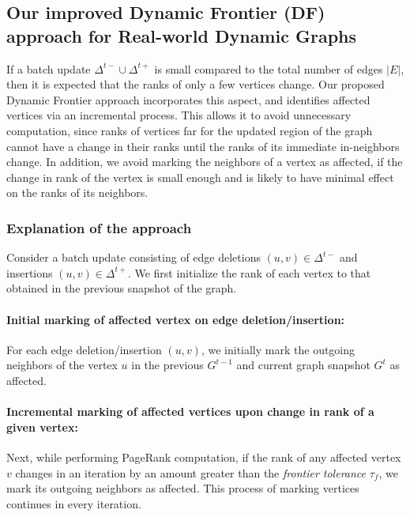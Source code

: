 \subsection{Our improved Dynamic Frontier (DF) approach for Real-world Dynamic Graphs}
\label{sec:frontier}

If a batch update $\Delta^{t-} \cup \Delta^{t+}$ is small compared to the total number of edges $|E|$, then it is expected that the ranks of only a few vertices change. Our proposed Dynamic Frontier approach incorporates this aspect, and identifies affected vertices via an incremental process. This allows it to avoid unnecessary computation, since ranks of vertices far for the updated region of the graph cannot have a change in their ranks until the ranks of its immediate in-neighbors change. In addition, we avoid marking the neighbors of a vertex as affected, if the change in rank of the vertex is small enough and is likely to have minimal effect on the ranks of its neighbors.


\subsubsection{Explanation of the approach}
\label{sec:frontier-explanation}

Consider a batch update consisting of edge deletions $(u, v) \in \Delta^{t-}$ and insertions $(u, v) \in \Delta^{t+}$. We first initialize the rank of each vertex to that obtained in the previous snapshot of the graph.



\paragraph{Initial marking of affected vertex on edge deletion/insertion:}

For each edge deletion/insertion $(u, v)$, we initially mark the outgoing neighbors of the vertex $u$ in the previous $G^{t-1}$ and current graph snapshot $G^t$ as affected.

\paragraph{Incremental marking of affected vertices upon change in rank of a given vertex:}

Next, while performing PageRank computation, if the rank of any affected vertex $v$ changes in an iteration by an amount greater than the \textit{frontier tolerance} $\tau_f$, we mark its outgoing neighbors as affected. This process of marking vertices continues in every iteration.


